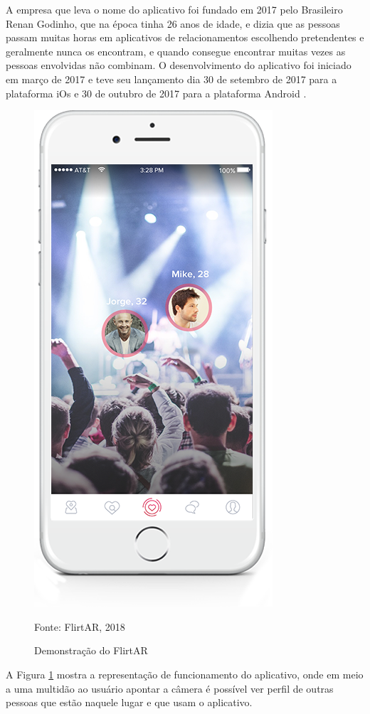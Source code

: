 	A empresa que leva o nome do aplicativo foi fundado em 2017 pelo Brasileiro Renan Godinho, que na época tinha 26 anos de idade, e dizia que as pessoas passam muitas horas em aplicativos de relacionamentos escolhendo pretendentes e geralmente nunca os encontram, e quando consegue encontrar muitas vezes as pessoas envolvidas não combinam. O desenvolvimento do aplicativo foi iniciado em março de 2017 e teve seu lançamento dia 30 de setembro de 2017 para a plataforma iOs e 30 de outubro de 2017 para a plataforma Android \cite{chloe:2017}.
	
	\begin{figure}[H]
		\centering
		\includegraphics[scale=0.4]{imagens/flirtar}
		\caption{Demonstração do FlirtAR}
		Fonte: FlirtAR, 2018
		\label{fig:flirtar}
	\end{figure}
	
	A Figura \ref{fig:flirtar} mostra a representação de funcionamento do aplicativo, onde em meio a uma multidão ao usuário apontar a câmera é possível ver perfil de outras pessoas que estão naquele lugar e que usam o aplicativo.
